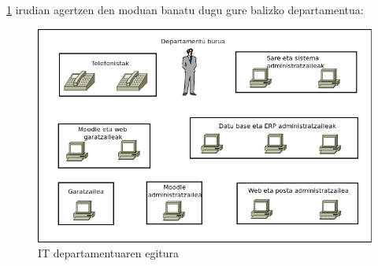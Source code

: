 \ref{fig:egitura} irudian agertzen den moduan banatu dugu gure balizko departamentua:

\begin{figure}
\centering
   \includegraphics[scale=0.5]{irudiak/cau.png}
   \caption{IT departamentuaren egitura}
   \label{fig:egitura}
\end{figure}


